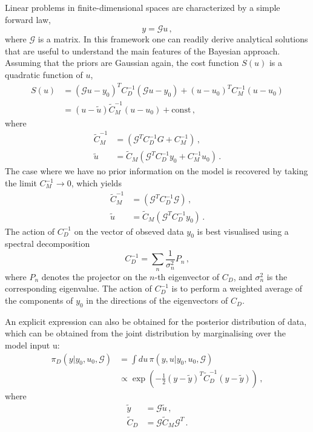 Linear problems in finite-dimensional spaces are characterized by a simple forward law, 
\begin{equation}
  \label{eq:MatrixG}
  y = \mathcal{G} u\, ,
\end{equation}
where $\mathcal{G}$ is a matrix. In this framework one can readily  derive
analytical solutions that are useful to understand the main features of the
Bayesian approach. Assuming that the priors are Gaussian again, the cost
function $S(u)$ is a quadratic function of $u$,
\begin{align}
  \label{eq:CostLinGauss}
  S(u) &= 
  \left(\mathcal{G} u - y_0 \right)^T C_D^{-1} 
  \left(\mathcal{G} u - y_0 \right) + 
  \left( u - u_0 \right)^T C_M^{-1} \left(u - u_0 \right) \\
  &= 
  \left(u - \tilde{u}\right) \tilde{C}_M^{-1}
  \left(u - u_0\right) + \mathrm{const}\, ,
\end{align} 
where
\begin{align}
  \label{eq:PostParams}
  \tilde{C}_M^{-1} &= 
  \left(
    \mathcal{G}^T C_D^{-1} G + C_M^{-1}
  \right)\, , \\
  \tilde{u} &=
  \tilde{C}_M  \left(
    \mathcal{G}^T C_D^{-1} y_0 + C_M^{-1} u_0
  \right)\, .
\end{align}
The case where we have no prior information on the model is recovered by taking
the limit $C_M^{-1} \to 0$, which yields
\begin{align}
  \label{eq:NoPriorLinModel}
  \tilde{C}_M^{-1} &= 
  \left(
    \mathcal{G}^T C_D^{-1} \mathcal{G}
  \right)\, , \\
  \tilde{u} &=
  \tilde{C}_M  \left(
    \mathcal{G}^T C_D^{-1} y_0 
  \right)\, .
\end{align}
The action of $C_D^{-1}$ on the vector of obseved data $y_0$ is best visualised using a spectral decomposition
\begin{equation}
  \label{eq:CDSpecDec}
  C_D^{-1} = \sum_n \frac{1}{\sigma_n^2} P_n\, ,
\end{equation}
where $P_n$ denotes the projector on the $n$-th eigenvector of $C_D$, and
$\sigma_n^2$ is the corresponding eigenvalue. The action of $C_D^{-1}$ is to
perform a weighted average of the components of $y_0$ in the directions of the
eigenvectors of $C_D$.

An explicit expression can also be obtained for the posterior distribution of
data, which can be obtained from the joint distribution by marginalising over
the model input u:
\begin{align}\label{eq:PosteriorDataSpace}
  \pi_D(y|y_0,u_0,\mathcal{G})
  &= \int du\, \pi(y,u|y_0,u_0,\mathcal{G}) \\
  &\propto \exp\left(
    -\frac12 \left(y - \tilde{y}\right)^T \tilde{C}_D^{-1}
    \left(y - \tilde{y}\right)
  \right)\, ,
\end{align}
where
\begin{align}\label{eq:PosteriorDataParams}
  \tilde{y} &= \mathcal{G} \tilde{u}\, , \\
  \tilde{C}_D &= \mathcal{G} \tilde{C}_M \mathcal{G}^T\, .
\end{align}

